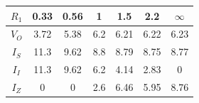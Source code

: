 \documentclass[12pt]{article}
\begin{document}
\begin{latin}
\begin{table}[H]
\begin{adjustbox}{width=\textwidth}
\begin{tabular}{|c|c|c|c|c|c|c|}
\hline
$R_1$ & 0.33 & 0.56 & 1 & 1.5 & 2.2 & $\infty$ \\
\hline
\hline
$V_O$ & 3.72 & 5.38 & 6.2 & 6.21 & 6.22 & 6.23 \\
\hline
$I_S$ & 11.3 & 9.62 & 8.8 & 8.79 & 8.75 & 8.77 \\
\hline
$I_I$ & 11.3 & 9.62 & 6.2 & 4.14 & 2.83 & 0 \\
\hline
$I_Z$ & 0 & 0 & 2.6 & 6.46 & 5.95 & 8.76 \\
\hline
\end{tabular}
\end{adjustbox}
\end{table}
\end{latin}
\end{document}
